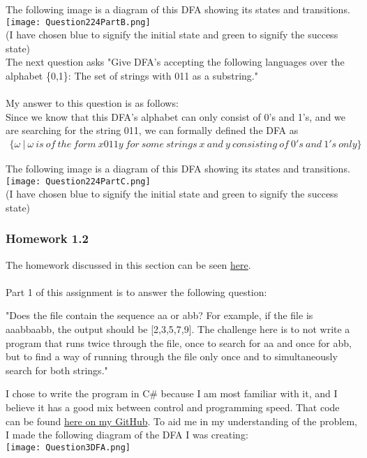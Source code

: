\documentclass{article}
\theoremstyle{theorem}
\theoremstyle{definition}
\theoremstyle{remark}
\begin{document}
The following image is a diagram of this DFA showing its states and transitions.\\
\texttt{[image: Question224PartB.png]}\\
(I have chosen blue to signify the initial state and green to signify the success state)\\

The next question asks "Give DFA's accepting the following languages over the alphabet \{0,1\}: The set of strings with 011 as a substring."\\\\
My answer to this question is as follows:\\
Since we know that this DFA's alphabet can only consist of 0's and 1's, and we are searching for the string 011, we can formally defined the DFA as 
\begin{align*}
    \{\omega\ |\ \omega\ is\ of\ the\ form\ x011y\ for\ some\ strings\ x\ and\ y\ consisting\ of\ 0's\ and\ 1's\ only \}
\end{align*}

The following image is a diagram of this DFA showing its states and transitions.\\
\texttt{[image: Question224PartC.png]}\\
(I have chosen blue to signify the initial state and green to signify the success state)\\

\subsubsection{Homework 1.2}
The homework discussed in this section can be seen \href{https://github.com/alexhkurz/compiler-construction-2022/blob/main/homework-1.2.md}{here}.\\\\

Part 1 of this assignment is to answer the following question: 
\begin{center}
    "Does the file contain the sequence aa or abb? For example, if the file is aaabbaabb, the output should be [2,3,5,7,9]. The challenge here is to not write a program that runs twice through the file, once to search for aa and once for abb, but to find a way of running through the file only once and to simultaneously search for both strings."
\end{center}

I chose to write the program in C\# because I am most familiar with it, and I believe it has a good mix between control and programming speed. That code can be found \href{https://github.com/mamba72/CompilerConstruction_Assignments/blob/main/Reports/ReportResources/StringSearchingImplementation.cs}{here on my GitHub}.
To aid me in my understanding of the problem, I made the following diagram of the DFA I was creating:\\
\texttt{[image: Question3DFA.png]}\\\\
\end{document}
